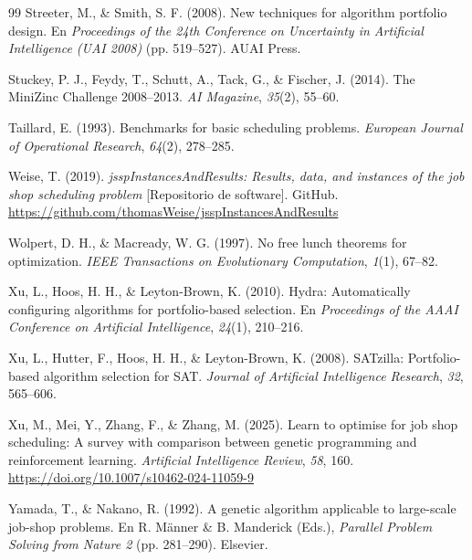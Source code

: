 \begin{thebibliography}{99}
Streeter, M., \& Smith, S. F. (2008). New techniques for algorithm portfolio
design. En \textit{Proceedings of the 24th Conference on Uncertainty in
Artificial Intelligence (UAI 2008)} (pp. 519--527). AUAI Press.

Stuckey, P. J., Feydy, T., Schutt, A., Tack, G., \& Fischer, J. (2014). The
MiniZinc Challenge 2008--2013. \textit{AI Magazine}, \textit{35}(2), 55--60.

Taillard, E. (1993). Benchmarks for basic scheduling problems.
\textit{European Journal of Operational Research}, \textit{64}(2), 278--285.

Weise, T. (2019). \textit{jsspInstancesAndResults: Results, data, and
instances of the job shop scheduling problem} [Repositorio de software].
GitHub. \url{https://github.com/thomasWeise/jsspInstancesAndResults}

Wolpert, D. H., \& Macready, W. G. (1997). No free lunch theorems for
optimization. \textit{IEEE Transactions on Evolutionary Computation},
\textit{1}(1), 67--82.

Xu, L., Hoos, H. H., \& Leyton-Brown, K. (2010). Hydra: Automatically
configuring algorithms for portfolio-based selection. En \textit{Proceedings of
the AAAI Conference on Artificial Intelligence}, \textit{24}(1), 210--216.

Xu, L., Hutter, F., Hoos, H. H., \& Leyton-Brown, K. (2008). SATzilla:
Portfolio-based algorithm selection for SAT. \textit{Journal of Artificial
Intelligence Research}, \textit{32}, 565--606.

Xu, M., Mei, Y., Zhang, F., \& Zhang, M. (2025). Learn to optimise for job
shop scheduling: A survey with comparison between genetic programming and
reinforcement learning. \textit{Artificial Intelligence Review}, \textit{58},
160. \url{https://doi.org/10.1007/s10462-024-11059-9}

Yamada, T., \& Nakano, R. (1992). A genetic algorithm applicable to
large-scale job-shop problems. En R. Männer \& B. Manderick (Eds.),
\textit{Parallel Problem Solving from Nature 2} (pp. 281--290). Elsevier.

\end{thebibliography}
